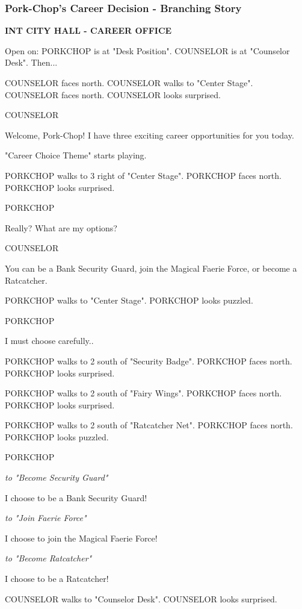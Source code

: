 \documentclass[11pt,letterpaper,oldstylefigures]{memoir}
\newcommand{\slugline}[1]{\nobreak\textbf{\MakeUppercase{#1}}\par\nobreak\vspace{1\baselineskip}}
\newcommand{\speaker}[1]{\nobreak\hspace*{0.333\textwidth}\MakeUppercase{#1}\par\nobreak\vspace{0.5\baselineskip}}
\newcommand{\dialogue}[1]{\nobreak\hspace*{0.25\textwidth}\begin{minipage}{0.5\textwidth}#1\end{minipage}\par\vspace{1\baselineskip}}
\newcommand{\parenthetical}[1]{\nobreak\vspace{0.5\baselineskip}\hspace*{0.292\textwidth}\begin{minipage}{0.416\textwidth}\textit{#1}\end{minipage}\par\vspace{0.5\baselineskip}}
\newcommand{\stagedir}[1]{#1\par\vspace{1\baselineskip}}
\newenvironment{FountainExample}
  {\begingroup
  \ttfamily\small
   \setlength{\parindent}{0pt}
  \setlength{\parskip}{0.5em}
  \allowdisplaybreaks
  \setlength{\displaywidowpenalty}{0}
  \setlength{\widowpenalty}{0}
  \setlength{\clubpenalty}{0}
  \setlength{\interlinepenalty}{0}
}
  {\endgroup}
\begin{document}
\subsubsection*{Pork-Chop's Career Decision - Branching Story}
\label{ex:pork-chop-career-decision-branching-story}

\begin{FountainExample}
\slugline{INT CITY HALL - CAREER OFFICE}

\stagedir{Open on: PORKCHOP is at "Desk Position". COUNSELOR is at "Counselor Desk". Then...}

\stagedir{COUNSELOR faces north. COUNSELOR walks to "Center Stage". COUNSELOR faces north. COUNSELOR looks surprised.}

\speaker{COUNSELOR}
\dialogue{Welcome, Pork-Chop! I have three exciting career opportunities for you today.}

\stagedir{"Career Choice Theme" starts playing.}

\stagedir{PORKCHOP walks to 3 right of "Center Stage". PORKCHOP faces north. PORKCHOP looks surprised.}

\speaker{PORKCHOP}
\dialogue{Really? What are my options?}

\speaker{COUNSELOR}
\dialogue{You can be a Bank Security Guard, join the Magical Faerie Force, or become a Ratcatcher.}

\stagedir{PORKCHOP walks to "Center Stage". PORKCHOP looks puzzled.}

\speaker{PORKCHOP}
\dialogue{I must choose carefully..}

\stagedir{PORKCHOP walks to 2 south of "Security Badge". PORKCHOP faces north. PORKCHOP looks surprised.}

\stagedir{PORKCHOP walks to 2 south of "Fairy Wings". PORKCHOP faces north. PORKCHOP looks surprised.}

\stagedir{PORKCHOP walks to 2 south of "Ratcatcher Net". PORKCHOP faces north. PORKCHOP looks puzzled.}

\speaker{PORKCHOP}
\parenthetical{to "Become Security Guard"}
\dialogue{I choose to be a Bank Security Guard!}

\parenthetical{to "Join Faerie Force"}
\dialogue{I choose to join the Magical Faerie Force!}

\parenthetical{to "Become Ratcatcher"}
\dialogue{I choose to be a Ratcatcher!}

\stagedir{COUNSELOR walks to "Counselor Desk". COUNSELOR looks surprised.}


\end{FountainExample}
\end{document}
